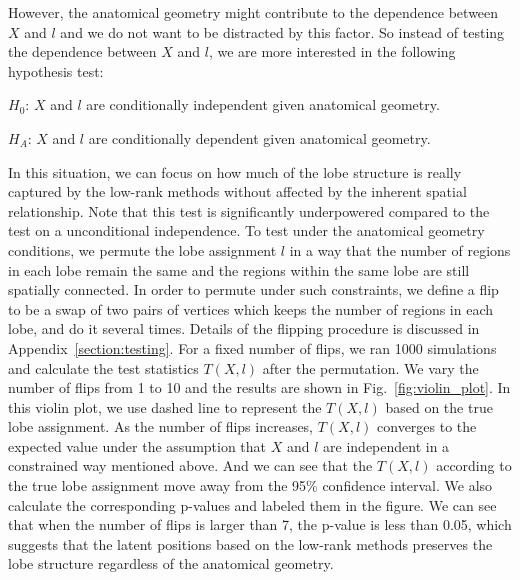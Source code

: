 \documentclass[10pt,letterpaper]{article}
\begin{document}
However, the anatomical geometry might contribute to the dependence between $X$ and $l$ and we do not want to be distracted by this factor. So instead of testing the dependence between $X$ and $l$, we are more interested in the following hypothesis test:

$H_0$: $X$ and $l$ are conditionally independent given anatomical geometry.

$H_A$: $X$ and $l$ are conditionally dependent given anatomical geometry.

In this situation, we can focus on how much of the lobe structure is really captured by the low-rank methods without affected by the inherent spatial relationship. Note that this test is significantly underpowered compared to the test on a unconditional independence.
To test under the anatomical geometry conditions, we permute the lobe assignment $l$ in a way that the number of regions in each lobe remain the same and the regions within the same lobe are still spatially connected. In order to permute under such constraints, we define a flip to be a swap of two pairs of vertices which keeps the number of regions in each lobe, and do it several times. Details of the flipping procedure is discussed in Appendix~\ref{section:testing}. For a fixed number of flips, we ran 1000 simulations and calculate the test statistics $T(X, l)$ after the permutation. We vary the number of flips from 1 to 10 and the results are shown in Fig.~\ref{fig:violin_plot}. In this violin plot, we use dashed line to represent the $T(X, l)$ based on the true lobe assignment. As the number of flips increases, $T(X, l)$ converges to the expected value under the assumption that $X$ and $l$ are independent in a constrained way mentioned above. And we can see that the $T(X, l)$ according to the true lobe assignment move away from the 95\% confidence interval. We also calculate the corresponding p-values and labeled them in the figure. We can see that when the number of flips is larger than 7, the p-value is less than 0.05, which suggests that the latent positions based on the low-rank methods preserves the lobe structure regardless of the anatomical geometry.
\end{document}
